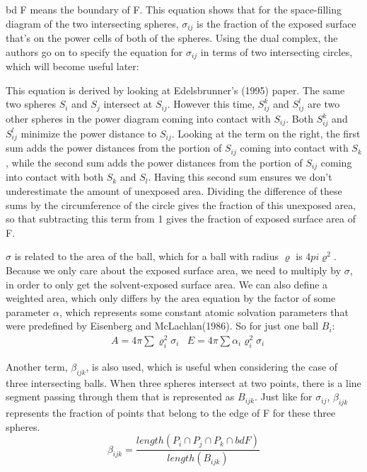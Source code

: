 \documentclass{article}
\begin{document}
bd F means the boundary of F. This equation shows that for the space-filling diagram of the two intersecting spheres, $\sigma_{ij}$ is the fraction of the exposed surface that's on the power cells of both of the spheres.
Using the dual complex, the authors go on to specify the equation for $\sigma_{ij}$ in terms of two intersecting circles, which will become useful later:

This equation is derived by looking at Edelsbrunner's (1995) paper. The same two spheres $S_i$ and $S_j$ intersect at $S_{ij}$. However this time, $S^k_{ij}$ and $S^l_{ij}$ are two other spheres in the power diagram coming into contact with $S_{ij}$. Both  $S^k_{ij}$ and $S^l_{ij}$ minimize the power distance to $S_{ij}$. Looking at the term on the right, the first sum adds the power distances from the portion of $S_{ij}$ coming into contact with $S_k$, while the second sum adds the power distances from the portion of $S_{ij}$ coming into contact with both $S_k$ and $S_l$. Having this second sum ensures we don't underestimate the amount of unexposed area. Dividing the difference of these sums by the circumference of the circle gives the fraction of this unexposed area, so that subtracting this term from 1 gives the fraction of exposed surface area of F.

$\sigma$ is related to the area of the ball, which for a ball with radius $\varrho$ is $4pi\varrho^2$. Because we only care about the exposed surface area, we need to multiply by $\sigma$, in order to only get the solvent-exposed surface area. We can also define a weighted area, which only differs by the area equation by the factor of some parameter $\alpha$, which represents some constant atomic solvation parameters that were predefined by Eisenberg and McLachlan(1986). So for just one ball $B_i$:
\begin{align*}
&A = 4\pi\sum \varrho_i^2\sigma_i
&E = 4\pi\sum\alpha_i\varrho_i^2\sigma_i
\end{align*}

Another term, $\beta_{ijk}$, is also used, which is useful when considering the case of three intersecting balls. When three spheres intersect at two points, there is a line segment passing through them that is represented as $B_{ijk}$. Just like for $\sigma_{ij}$, $\beta_{ijk}$ represents the fraction of points that belong to the edge of F for these three spheres.
\begin{equation*}
\beta_{ijk} = \frac{length(P_i \cap P_j \cap P_k \cap bd F)}{length(B_{ijk})}
\end{equation*}
\end{document}
